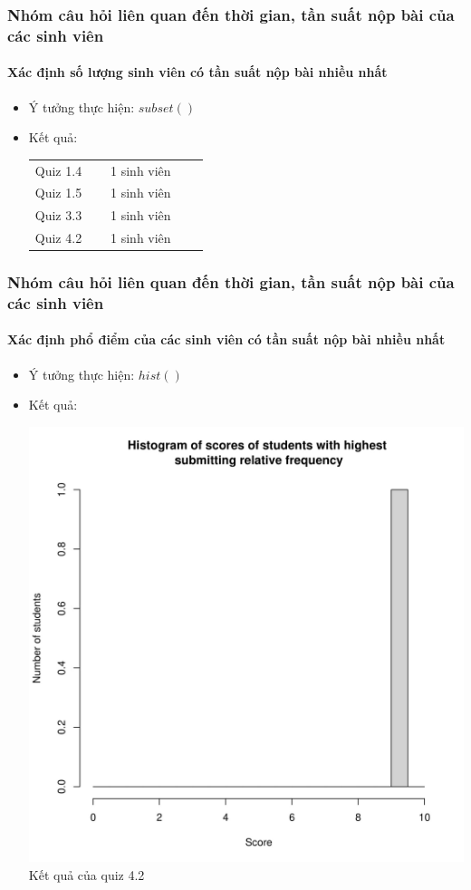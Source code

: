 \documentclass[english,10pt,table]{beamer}
\begin{document}
\frame
{
\frametitle{Nhóm câu hỏi liên quan đến thời gian, tần suất nộp bài của các sinh viên}
\framesubtitle{Xác định số lượng sinh viên có tần suất nộp bài nhiều nhất}
\begin{itemize}
    \item Ý tưởng thực hiện: $subset()$
    \item Kết quả:\\
    \begin{center}
        \begin{tabular}{l l c c c}
             Quiz 1.4 & $\;$ & 1 sinh viên\\
             Quiz 1.5 & $\;$ & 1 sinh viên\\
             Quiz 3.3 & $\;$ & 1 sinh viên\\
             Quiz 4.2 & $\;$ & 1 sinh viên
        \end{tabular}
    \end{center}
\end{itemize}
}

\frame
{
\frametitle{Nhóm câu hỏi liên quan đến thời gian, tần suất nộp bài của các sinh viên}
\framesubtitle{Xác định phổ điểm của các sinh viên có tần suất nộp bài nhiều nhất}
\begin{itemize}
    \item Ý tưởng thực hiện: $hist()$
    \item Kết quả:\\
    \begin{center}
        \includegraphics[width = 6 cm]{Images/img4-3-4.png}\\
        Kết quả của quiz 4.2
    \end{center}
\end{itemize}
}
\end{document}
